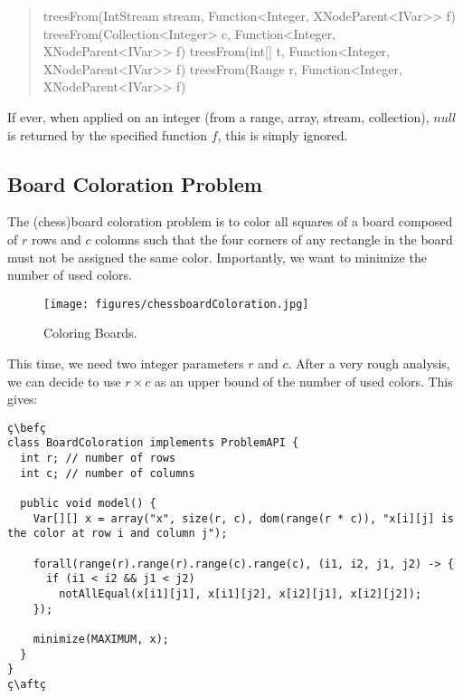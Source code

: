 \documentclass[10pt]{article}
\newcommand{\nn}[1]{{\tt #1}} %
\newenvironment{myvb}{\endgraf\small\verbatim}{\endverbatim}
\def\bef{\rule{10cm}{0.1mm}} %
\def\aft{\rule{10cm}{0.1mm}\medskip}
\begin{document}
\begin{quote}
\begin{myvb}
treesFrom(IntStream stream, Function<Integer, XNodeParent<IVar>> f) 
treesFrom(Collection<Integer> c, Function<Integer, XNodeParent<IVar>> f) 
treesFrom(int[] t, Function<Integer, XNodeParent<IVar>> f) 
treesFrom(Range r, Function<Integer, XNodeParent<IVar>> f) 
\end{myvb}
\end{quote}

If ever, when applied on an integer (from a range, array, stream, collection), $null$ is returned by the specified function $f$, this is simply ignored.



\subsection{Board Coloration Problem}

The (chess)board coloration problem is to color all squares of a board composed of $r$ rows and $c$ colomns such that the four corners of any rectangle in the board must not be assigned the same color.
Importantly, we want to minimize the number of used colors.

\begin{figure}[h]
\begin{center}
  \texttt{[image: figures/chessboardColoration.jpg]}
\end{center}
\caption{Coloring Boards.\label{fig:board}}
\end{figure}

This time, we need two integer parameters $r$ and $c$.
After a very rough analysis, we can decide to use $r \times c$ as an upper bound of the number of used colors. 
This gives:


\begin{lstlisting}
ç\befç
class BoardColoration implements ProblemAPI {
  int r; // number of rows 
  int c; // number of columns

  public void model() {
    Var[][] x = array("x", size(r, c), dom(range(r * c)), "x[i][j] is the color at row i and column j");
    
    forall(range(r).range(r).range(c).range(c), (i1, i2, j1, j2) -> {
      if (i1 < i2 && j1 < j2)
        notAllEqual(x[i1][j1], x[i1][j2], x[i2][j1], x[i2][j2]);
    });
    
    minimize(MAXIMUM, x);
  }
}
ç\aftç
\end{lstlisting}
\end{document}
